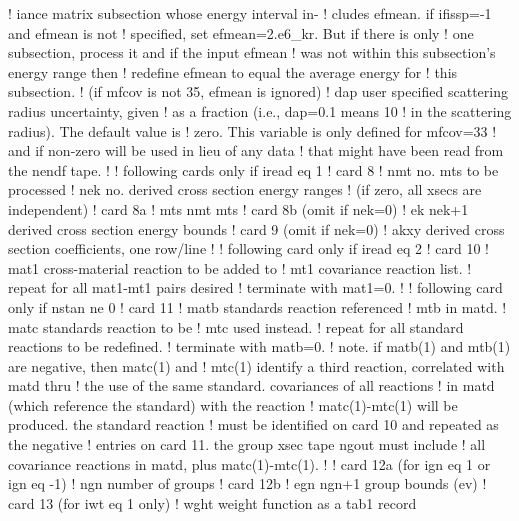 \begin{ccode}
   !            iance matrix subsection whose energy interval in-
   !            cludes efmean.  if ifissp=-1 and efmean is not
   !            specified, set efmean=2.e6_kr.  But if there is only
   !            one subsection, process it and if the input efmean
   !            was not within this subsection's energy range then
   !            redefine efmean to equal the average energy for
   !            this subsection.
   !            (if mfcov is not 35, efmean is ignored)
   !    dap     user specified scattering radius uncertainty, given
   !            as a fraction (i.e., dap=0.1 means 10%
   !            in the scattering radius).  The default value is
   !            zero.  This variable is only defined for mfcov=33
   !            and if non-zero will be used in lieu of any data
   !            that might have been read from the nendf tape.
   !
   !  following cards only if iread eq 1
   !  card 8
   !    nmt     no. mts to be processed
   !    nek     no. derived cross section energy ranges
   !            (if zero, all xsecs are independent)
   !  card 8a
   !    mts     nmt mts
   !  card 8b   (omit if nek=0)
   !    ek      nek+1 derived cross section energy bounds
   !  card 9    (omit if nek=0)
   !    akxy    derived cross section coefficients, one row/line
   !
   !  following card only if iread eq 2
   !  card 10
   !    mat1    cross-material reaction to be added to
   !    mt1         covariance reaction list.
   !            repeat for all mat1-mt1 pairs desired
   !            terminate with mat1=0.
   !
   !  following card only if nstan ne 0
   !  card 11
   !    matb    standards reaction referenced
   !    mtb         in matd.
   !    matc    standards reaction to be
   !    mtc         used instead.
   !            repeat for all standard reactions to be redefined.
   !            terminate with matb=0.
   !  note.  if matb(1) and mtb(1) are negative, then matc(1) and
   !    mtc(1) identify a third reaction, correlated with matd thru
   !    the use of the same standard.  covariances of all reactions
   !    in matd (which reference the standard) with the reaction
   !    matc(1)-mtc(1) will be produced.  the standard reaction
   !    must be identified on card 10 and repeated as the negative
   !    entries on card 11.  the group xsec tape ngout must include
   !    all covariance reactions in matd, plus matc(1)-mtc(1).
   !
   !  card 12a (for ign eq 1 or ign eq -1)
   !    ngn     number of groups
   !  card 12b
   !    egn     ngn+1 group bounds (ev)
   !  card 13 (for iwt eq 1 only)
   !    wght    weight function as a tab1 record

\end{ccode}
